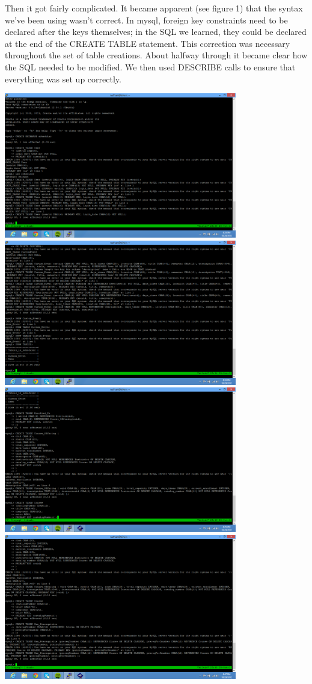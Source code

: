 \documentclass[pdftex,12pt,letter]{article}
\begin{document}
Then it got fairly complicated.  It became apparent (see figure 1) that the syntax we've been using wasn't correct.  In mysql, foreign key constraints need to be declared after the keys themselves; in the SQL we learned, they could be declared at the end of the CREATE TABLE statement.  This correction was necessary throughout the set of table creations.  About halfway through it became clear how the SQL needed to be modified.  We then used DESCRIBE calls to ensure that everything was set up correctly.
\begin{flushleft}
\includegraphics[width=4in]{db1.png}
\FloatBarrier
\includegraphics[width=4in]{db2.png}
\FloatBarrier
\includegraphics[width=4in]{db3.png}
\FloatBarrier
\includegraphics[width=4in]{db4.png}

\end{flushleft}
\end{document}
